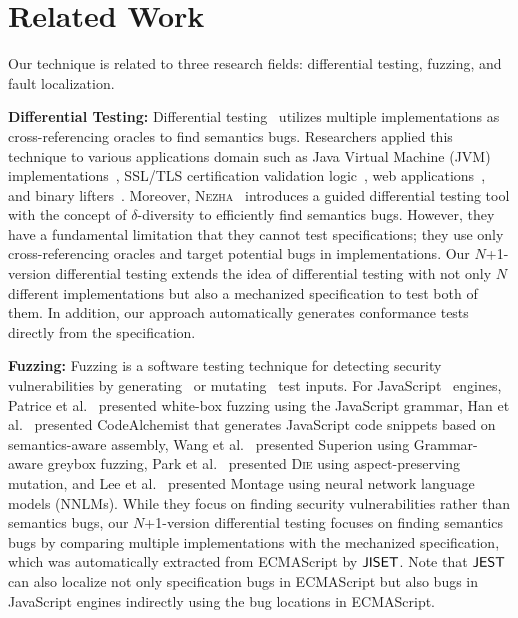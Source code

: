 \section{Related Work}\label{sec:related}

Our technique is related to three research fields: differential testing,
fuzzing, and fault localization.

\textbf{Differential Testing:} Differential testing~\cite{diff-test} utilizes
multiple implementations as cross-referencing oracles to find semantics bugs.
Researchers applied this technique to various applications domain such as Java
Virtual Machine (JVM) implementations~\cite{diff-jvm}, SSL/TLS certification
validation logic~\cite{nezha,diff-ssl,diff-ssl2}, web
applications~\cite{diff-web}, and binary lifters~\cite{ir-diff-test}.
Moreover, \textsc{Nezha}~\cite{nezha} introduces a guided differential testing tool with
the concept of $\delta$-diversity to efficiently find semantics bugs.
However, they have a fundamental limitation that they cannot test specifications;
they use only cross-referencing oracles and target potential bugs in implementations.
Our $N$+1-version differential testing extends the idea of
differential testing with not only $N$ different 
implementations but also a mechanized specification to test both of them.
In addition, our approach automatically generates conformance tests directly from
the specification.

\textbf{Fuzzing:} Fuzzing is a software testing technique for detecting
security vulnerabilities by generating~\cite{imf,gen-fuzzing,csmith} or
mutating~\cite{mutate-fuzzing,mutate-fuzzing2,mutate-fuzzing3} test inputs.
For JavaScript~\cite{js-hopl} engines,
Patrice et al.~\cite{grammar-whitebox} presented white-box fuzzing using the JavaScript grammar,
Han et al.~\cite{codealchemist} presented CodeAlchemist that generates JavaScript code
snippets based on semantics-aware assembly,
Wang et al.~\cite{superion} presented Superion using Grammar-aware greybox fuzzing,
Park et al.~\cite{die} presented \textsc{Die} using aspect-preserving mutation,
and Lee et al.~\cite{montage} presented Montage using neural network language models (NNLMs).
While they focus on finding security vulnerabilities rather than
semantics bugs, our $N$+1-version differential testing
focuses on finding semantics bugs by comparing multiple
implementations with the mechanized specification,
which was automatically extracted from ECMAScript by $\jiset$.
Note that $\tool$ can also localize not only specification bugs in ECMAScript
but also bugs in JavaScript engines indirectly using the bug locations in ECMAScript.

